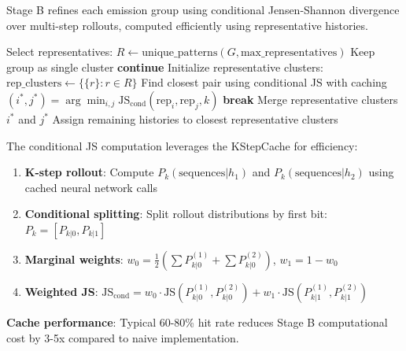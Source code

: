 \documentclass[11pt]{article}
\begin{document}
Stage B refines each emission group using conditional Jensen-Shannon divergence over multi-step rollouts, computed efficiently using representative histories.

\begin{codebox}
\begin{algorithmic}
    \STATE Select representatives: $R \leftarrow \text{unique\_patterns}(G, \text{max\_representatives})$
        \STATE Keep group as single cluster 
        \STATE \textbf{continue}
    \ENDIF
    \STATE Initialize representative clusters: $\text{rep\_clusters} \leftarrow \{\{r\} : r \in R\}$
        \STATE Find closest pair using conditional JS with caching
        \STATE $(i^*, j^*) = \arg\min_{i,j} \text{JS}_{\text{cond}}(\text{rep}_i, \text{rep}_j, k)$
            \STATE \textbf{break} 
        \ENDIF
        \STATE Merge representative clusters $i^*$ and $j^*$
    \ENDWHILE
    \STATE Assign remaining histories to closest representative clusters
\ENDFOR
\end{algorithmic}
\end{codebox}

\begin{resultbox}
The conditional JS computation leverages the KStepCache for efficiency:

\begin{enumerate}
\item \textbf{K-step rollout}: Compute $P_k(\text{sequences}|h_1)$ and $P_k(\text{sequences}|h_2)$ using cached neural network calls
\item \textbf{Conditional splitting}: Split rollout distributions by first bit: $P_k = [P_{k|0}, P_{k|1}]$
\item \textbf{Marginal weights}: $w_0 = \frac{1}{2}(\sum P_{k|0}^{(1)} + \sum P_{k|0}^{(2)})$, $w_1 = 1 - w_0$
\item \textbf{Weighted JS}: $\text{JS}_{\text{cond}} = w_0 \cdot \text{JS}(P_{k|0}^{(1)}, P_{k|0}^{(2)}) + w_1 \cdot \text{JS}(P_{k|1}^{(1)}, P_{k|1}^{(2)})$
\end{enumerate}

\textbf{Cache performance}: Typical 60-80\% hit rate reduces Stage B computational cost by 3-5x compared to naive implementation.
\end{resultbox}
\end{document}
